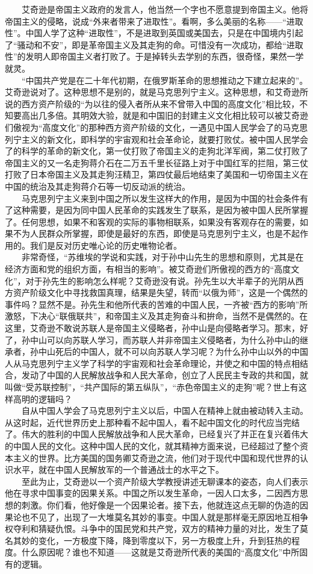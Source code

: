 \documentclass[cn,11pt,chinese]{elegantbook}
\begin{document}
　　艾奇逊是帝国主义政府的发言人，他当然一个字也不愿意提到帝国主义。他将帝国主义的侵略，说成“外来者带来了进取性”。看啊，多么美丽的名称——“进取性”。中国人学了这种“进取性”，不是进取到英国或美国去，只是在中国境内引起了“骚动和不安”，即是革帝国主义及其走狗的命。可惜没有一次成功，都给“进取性”的发明人即帝国主义者打败了。于是掉转头去学别的东西，很奇怪，果然一学就灵。\\
　　“中国共产党是在二十年代初期，在俄罗斯革命的思想推动之下建立起来的”。艾奇逊说对了。这种思想不是别的，就是马克思列宁主义。这种思想，和艾奇逊所说的西方资产阶级的“为以往的侵入者所从来不曾带入中国的高度文化”相比较，不知要高出几多倍。其明效大验，就是和中国旧的封建主义文化相比较可以被艾奇逊们傲视为“高度文化”的那种西方资产阶级的文化，一遇见中国人民学会了的马克思列宁主义的新文化，即科学的宇宙观和社会革命论，就要打败仗。被中国人民学会了的科学的革命的新文化，第一仗打败了帝国主义的走狗北洋军阀，第二仗打败了帝国主义的又一名走狗蒋介石在二万五千里长征路上对于中国红军的拦阻，第三仗打败了日本帝国主义及其走狗汪精卫，第四仗最后地结束了美国和一切帝国主义在中国的统治及其走狗蒋介石等一切反动派的统治。\\
　　马克思列宁主义来到中国之所以发生这样大的作用，是因为中国的社会条件有了这种需要，是因为同中国人民革命的实践发生了联系，是因为被中国人民所掌握了。任何思想，如果不和客观的实际的事物相联系，如果没有客观存在的需要，如果不为人民群众所掌握，即使是最好的东西，即使是马克思列宁主义，也是不起作用的。我们是反对历史唯心论的历史唯物论者。\\
　　非常奇怪，“苏维埃的学说和实践，对于孙中山先生的思想和原则，尤其是在经济方面和党的组织方面，有相当的影响”。被艾奇逊们所傲视的西方的“高度文化”，对于孙先生的影响怎么样呢？艾奇逊没有说。孙先生以大半辈子的光阴从西方资产阶级文化中寻找救国真理，结果是失望，转而“以俄为师”，这是一个偶然的事件吗？显然不是。孙先生和他所代表的苦难的中国人民，一齐被“西方的影响”所激怒，下决心“联俄联共”，和帝国主义及其走狗奋斗和拚命，当然不是偶然的。在这里，艾奇逊不敢说苏联人是帝国主义侵略者，孙中山是向侵略者学习。那末，好了，孙中山可以向苏联人学习，而苏联人并非帝国主义侵略者，为什么孙中山的继承者，孙中山死后的中国人，就不可以向苏联人学习呢？为什么孙中山以外的中国人从马克思列宁主义学了科学的宇宙观和社会革命理论，并使之和中国的特点相结合，发动了中国的人民解放战争和人民大革命，创立了人民民主专政的共和国，就叫做“受苏联控制”，“共产国际的第五纵队”，“赤色帝国主义的走狗”呢？世上有这样高明的逻辑吗？\\
　　自从中国人学会了马克思列宁主义以后，中国人在精神上就由被动转入主动。从这时起，近代世界历史上那种看不起中国人，看不起中国文化的时代应当完结了。伟大的胜利的中国人民解放战争和人民大革命，已经复兴了并正在复兴着伟大的中国人民的文化。这种中国人民的文化，就其精神方面来说，已经超过了整个资本主义的世界。比方美国的国务卿艾奇逊之流，他们对于现代中国和现代世界的认识水平，就在中国人民解放军的一个普通战士的水平之下。\\
　　至此为止，艾奇逊以一个资产阶级大学教授讲述无聊课本的姿态，向人们表示他在寻求中国事变的因果关系。中国之所以发生革命，一因人口太多，二因西方思想的刺激。你们看，他好像是一个因果论者。接下去，他就连这点无聊的伪造的因果论也不见了，出现了一大堆莫名其妙的事变。中国人就是那样毫无原因地互相争权夺利和猜疑仇恨。斗争中的国民党和共产党，双方的精神力量的对比，发生了莫名其妙的变化，一方极度下降，降到零度以下，另一方极度上升，升到狂热的程度。什么原因呢？谁也不知道——这就是艾奇逊所代表的美国的“高度文化”中所固有的逻辑。\\
\newpage
\end{document}

